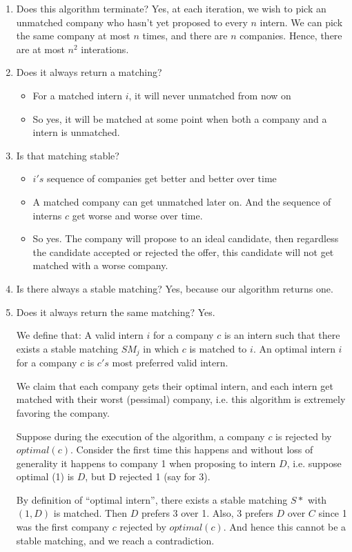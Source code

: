 \documentclass[twoside]{article}
\begin{document}
\begin{enumerate}
	\item Does this algorithm terminate? Yes, at each iteration, we wish to pick an unmatched company who hasn't yet proposed to every $n$ intern. We can pick the same company at most $n$ times, and there are $n$ companies. Hence, there are at most $n^2$ interations. 
	\item Does it always return a matching? \begin{itemize}
	\item For a matched intern $i$, it will never unmatched from now on
	\item So yes, it will be matched at some point when both a company and a intern is unmatched. 
	\end{itemize}
	\item Is that matching stable? 
	      \begin{itemize}
	      	\item $i's$ sequence of companies get better and better over time
	      	\item A matched company can get unmatched later on. And the sequence of interns $c$ get worse and worse over time. 
	      	\item So yes. The company will propose to an ideal candidate, then regardless the candidate accepted or rejected the offer, this candidate will not get matched with a worse company.
	      \end{itemize}
	\item Is there always a stable matching? Yes, because our algorithm returns one. 
	\item Does it always return the same matching? Yes. 
	      	
	      We define that: A valid intern $i$ for a company $c$ is an intern such that there exists a stable matching $SM_j$ in which $c$ is matched to $i$. An optimal intern $i$ for a company $c$ is $c's$ most preferred valid intern. 
	      	
	      We claim that each company gets their optimal intern, and each intern get matched with their worst (pessimal) company, i.e. this algorithm is extremely favoring the company. 
	      	
	      Suppose during the execution of the algorithm, a company $c$ is rejected by $optimal(c)$. Consider the first time this happens and without loss of generality it happens to company 1 when proposing to intern $D$, i.e. suppose optimal (1) is $D$, but D rejected 1 (say for 3). 
	      	
	      By definition of ``optimal intern'', there exists a stable matching $S*$ with $(1, D)$ is matched. Then $D$ prefers 3 over 1. Also, 3 prefers $D$ over $C$ since 1 was the first company $c$ rejected by $optimal(c)$. And hence this cannot be a stable matching, and we reach a contradiction. 
\end{enumerate}
\end{document}
